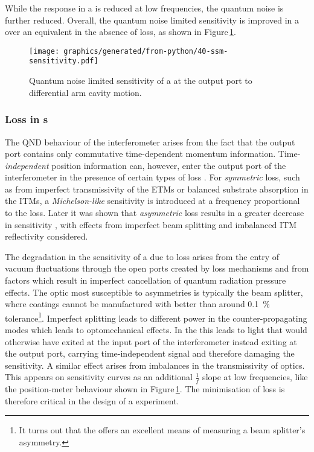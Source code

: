 While the response in a \SSM{} is reduced at low frequencies, the quantum noise is further reduced. Overall, the quantum noise limited sensitivity is improved in a \SSM{} over an equivalent \FPMI{} in the absence of loss, as shown in Figure\,\ref{fig:ssm-sensitivity}.

\begin{figure}
  \centering
  \texttt{[image: graphics/generated/from-python/40-ssm-sensitivity.pdf]}
  \caption[Sensitivity of a \SSM{} at the output port to differential arm cavity motion]{\label{fig:ssm-sensitivity}Quantum noise limited sensitivity of a \SSM{} at the output port to differential arm cavity motion.}
\end{figure}

\subsubsection{Loss in \SSM{}s}
The \gls{QND} behaviour of the interferometer arises from the fact that the output port contains only commutative time-dependent momentum information. Time-\emph{independent} position information can, however, enter the output port of the interferometer in the presence of certain types of loss \cite{Danilishin2004}. For \emph{symmetric} loss, such as from imperfect transmissivity of the \glspl{ETM} or balanced substrate absorption in the \glspl{ITM}, a \emph{Michelson-like} sensitivity is introduced at a frequency proportional to the loss. Later it was shown that \emph{asymmetric} loss results in a greater decrease in sensitivity \cite{Danilishin2015}, with effects from imperfect beam splitting and imbalanced \gls{ITM} reflectivity considered.

The degradation in the sensitivity of a \SSM{} due to loss arises from the entry of vacuum fluctuations through the open ports created by loss mechanisms and from factors which result in imperfect cancellation of quantum radiation pressure effects. The optic most susceptible to asymmetries is typically the beam splitter, where coatings cannot be manufactured with better than around \SI{0.1}{\percent} tolerance\footnote{It turns out that the \SSM{} offers an excellent means of measuring a beam splitter's asymmetry.}. Imperfect splitting leads to different power in the counter-propagating modes which leads to optomechanical effects. In the \SSM{} this leads to light that would otherwise have exited at the input port of the interferometer instead exiting at the output port, carrying time-independent signal and therefore damaging the sensitivity. A similar effect arises from imbalances in the transmissivity of optics. This appears on sensitivity curves as an additional $\frac{1}{f}$ slope at low frequencies, like the position-meter behaviour shown in Figure\,\ref{fig:ssm-sensitivity}. The minimisation of loss is therefore critical in the design of a \SSM{} experiment.

